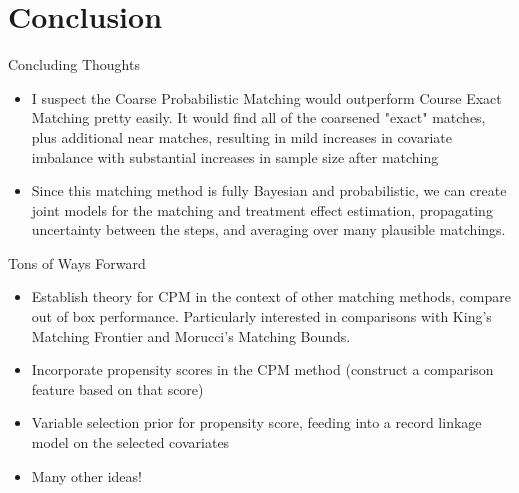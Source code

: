 \documentclass{beamer}
\begin{document}
\section{Conclusion}
\begin{frame}{Concluding Thoughts}
	\begin{itemize}
		\item I suspect the Coarse Probabilistic Matching would outperform Course Exact Matching pretty easily. It would find all of the coarsened "exact" matches, plus additional near matches, resulting in mild increases in covariate imbalance with substantial increases in sample size after matching
		\item Since this matching method is fully Bayesian and probabilistic, we can create joint models for the matching and treatment effect estimation, propagating uncertainty between the steps, and averaging over many plausible matchings.
	\end{itemize}
\end{frame}

\begin{frame}{Tons of Ways Forward}
	\begin{itemize}
		\item Establish theory for CPM in the context of other matching methods, compare out of box performance. Particularly interested in comparisons with King's Matching Frontier and Morucci's Matching Bounds.
		\item Incorporate propensity scores in the CPM method (construct a comparison feature based on that score)
		\item Variable selection prior for propensity score, feeding into a record linkage model on the selected covariates
		\item Many other ideas!
	\end{itemize}
\end{frame}
\end{document}
